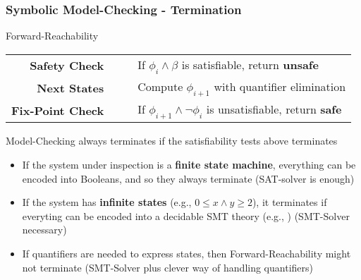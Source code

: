 \begin{frame}
  \frametitle{Symbolic Model-Checking - Termination}

  \begin{boxedminipage}{\textwidth}
  \begin{center}
  Forward-Reachability
  \begin{tabular}{rcl}
     \\
       {\bf Safety Check} & ~~ & If $\phi_i \wedge \beta$ is satisfiable, return {\bf unsafe} \\
        {\bf Next States} & ~~ & Compute $\phi_{i+1}$ with quantifier elimination \\
    {\bf Fix-Point Check} & ~~ & If $\phi_{i+1} \wedge \neg \phi_i$ is unsatisfiable, return {\bf safe} 
  \end{tabular}
  \end{center}
  \end{boxedminipage}
  \vfill
  Model-Checking always terminates if the satisfiability
  tests above terminates
  \begin{itemize}

    \item If the system under inspection 
	  is a {\bf finite state machine}, everything can be encoded
	  into Booleans, and so they always terminate (SAT-solver is enough)

    \item If the system has {\bf infinite states} (e.g., $0 \leq x \wedge y \geq 2$), 
	  it terminates if everyting can be encoded into a decidable SMT theory
	  (e.g., \Lia) (SMT-Solver necessary)

    \item If quantifiers are needed to express states, then Forward-Reachability
          might not terminate (SMT-Solver plus clever way of handling quantifiers)

  \end{itemize}

\end{frame}
